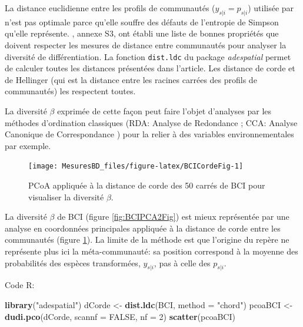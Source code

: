 \documentclass[
  11pt,
  french,
  a4paper,
  extrafontsizes,onecolumn,openright
  ]{memoir}
\newenvironment{Shaded}{\begin{snugshade}}{\end{snugshade}}
\newcommand{\AttributeTok}[1]{\textcolor[rgb]{0.13,0.29,0.53}{#1}}
\newcommand{\ConstantTok}[1]{\textcolor[rgb]{0.56,0.35,0.01}{#1}}
\newcommand{\DecValTok}[1]{\textcolor[rgb]{0.00,0.00,0.81}{#1}}
\newcommand{\FunctionTok}[1]{\textcolor[rgb]{0.13,0.29,0.53}{\textbf{#1}}}
\newcommand{\NormalTok}[1]{#1}
\newcommand{\OtherTok}[1]{\textcolor[rgb]{0.56,0.35,0.01}{#1}}
\newcommand{\StringTok}[1]{\textcolor[rgb]{0.31,0.60,0.02}{#1}}
\begin{document}
La distance euclidienne entre les profils de communautés (\(y_{s|i} = p_{s|i}\)) utilisée par \textcite{terBraak1983} n'est pas optimale parce qu'elle souffre des défauts de l'entropie de Simpson \autocite{Jost2007} qu'elle représente.
\textcite{Legendre2013}, annexe S3, ont établi une liste de bonnes propriétés que doivent respecter les mesures de distance entre communautés pour analyser la diversité de différentiation.
La fonction \texttt{dist.ldc} du package \emph{adespatial} permet de calculer toutes les distances présentées dans l'article.
Les distance de corde et de Hellinger (qui est la distance entre les racines carrées des profils de communautés) les respectent toutes.

La diversité \(\beta\) exprimée de cette façon peut faire l'objet d'analyses par les méthodes d'ordination classiques (RDA: Analyse de Redondance \autocite{Rao1964}; CCA: Analyse Canonique de Correspondance \autocite{Braak1986}) pour la relier à des variables environnementales par exemple\autocite{Legendre2013}.



\scriptsize

\begin{figure}

{\centering \texttt{[image: MesuresBD\_files/figure-latex/BCICordeFig-1]} 

}

\caption{PCoA appliquée à la distance de corde des 50 carrés de BCI pour visualiser la diversité \(\beta\).}\label{fig:BCICordeFig}
\end{figure}

\normalsize

La diversité \(\beta\) de BCI (figure \ref{fig:BCIPCA2Fig}) est mieux représentée par une analyse en coordonnées principales appliquée à la distance de corde entre les communautés (figure \ref{fig:BCICordeFig}).
La limite de la méthode est que l'origine du repère ne représente plus ici la méta-communauté: sa position correspond à la moyenne des probabilités des espèces transformées, \(y_{s|i}\), pas à celle des \(p_{s|i}\).

Code R:

\scriptsize

\begin{Shaded}
\begin{Highlighting}[]
\FunctionTok{library}\NormalTok{(}\StringTok{"adespatial"}\NormalTok{)}
\NormalTok{dCorde }\OtherTok{\textless{}{-}} \FunctionTok{dist.ldc}\NormalTok{(BCI, }\AttributeTok{method =} \StringTok{"chord"}\NormalTok{)}
\NormalTok{pcoaBCI }\OtherTok{\textless{}{-}} \FunctionTok{dudi.pco}\NormalTok{(dCorde, }\AttributeTok{scannf =} \ConstantTok{FALSE}\NormalTok{, }\AttributeTok{nf =} \DecValTok{2}\NormalTok{)}
\FunctionTok{scatter}\NormalTok{(pcoaBCI)}
\end{Highlighting}
\end{Shaded}
\end{document}
